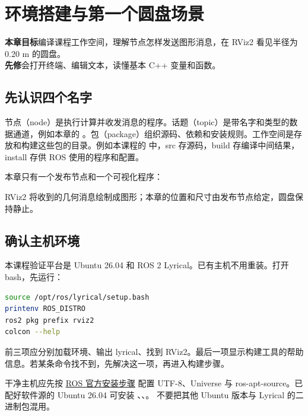 \chapter{环境搭建与第一个圆盘场景}\label{ch:first}
\begin{notebox}
\textbf{本章目标}\quad 编译课程工作空间，理解节点怎样发送图形消息，在 RViz2 看见半径为 0.20 m 的圆盘。\\
\textbf{先修}\quad 会打开终端、编辑文本，读懂基本 C++ 变量和函数。
\end{notebox}

\section{先认识四个名字}
节点（node）是执行计算并收发消息的程序。话题（topic）是带名字和类型的数据通道，例如本章的 。包（package）组织源码、依赖和安装规则。工作空间是存放和构建这些包的目录。例如本课程的  中，src 存源码，build 存编译中间结果，install 存供 ROS 使用的程序和配置。

本章只有一个发布节点和一个可视化程序：
\begin{center}
\end{center}
RViz2 将收到的几何消息绘制成图形；本章的位置和尺寸由发布节点给定，圆盘保持静止。

\section{确认主机环境}
本课程验证平台是 Ubuntu 26.04 和 ROS 2 Lyrical。已有主机不用重装。打开 bash，先运行：
\begin{lstlisting}[language=bash,numbers=none]
source /opt/ros/lyrical/setup.bash
printenv ROS_DISTRO
ros2 pkg prefix rviz2
colcon --help
\end{lstlisting}
前三项应分别加载环境、输出 lyrical、找到 RViz2。最后一项显示构建工具的帮助信息。若某条命令找不到，先解决这一项，再进入构建步骤。

干净主机应先按
\href{https://github.com/ros2/ros2_documentation/blob/rolling/source/Get-Started/Installation/Ubuntu-Install-Debs.rst}{ROS 官方安装步骤}
配置 UTF-8、Universe 与 ros-apt-source。已配好软件源的 Ubuntu 26.04 可安装
、、。
不要把其他 Ubuntu 版本与 Lyrical 的二进制包混用。

